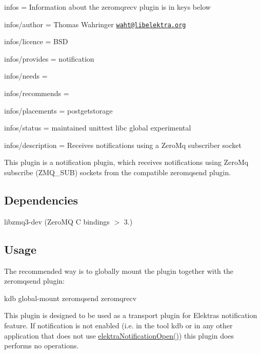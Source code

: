 
\begin{DoxyItemize}
\item infos = Information about the zeromqrecv plugin is in keys below
\item infos/author = Thomas Wahringer \href{mailto:waht@libelektra.org}{\tt waht@libelektra.\+org}
\item infos/licence = B\+SD
\item infos/provides = notification
\item infos/needs =
\item infos/recommends =
\item infos/placements = postgetstorage
\item infos/status = maintained unittest libc global experimental
\item infos/description = Receives notifications using a Zero\+Mq subscriber socket
\end{DoxyItemize}

This plugin is a notification plugin, which receives notifications using Zero\+Mq subscribe ({\ttfamily Z\+M\+Q\+\_\+\+S\+UB}) sockets from the compatible zeromqsend plugin.

\subsection*{Dependencies}


\begin{DoxyItemize}
\item {\ttfamily libzmq3-\/dev} (Zero\+MQ C bindings $>$ 3.)
\end{DoxyItemize}

\subsection*{Usage}

The recommended way is to globally mount the plugin together with the zeromqsend plugin\+: \begin{DoxyVerb}    kdb global-mount zeromqsend zeromqrecv
\end{DoxyVerb}


This plugin is designed to be used as a transport plugin for Elektra\textquotesingle{}s notification feature. If notification is not enabled (i.\+e. in the tool {\ttfamily kdb} or in any other application that does not use {\ttfamily \hyperlink{group__kdbnotification_gaeae96154abdb5fdbf1b34a01e2b23e44}{elektra\+Notification\+Open()}}) this plugin does performs no operations.

